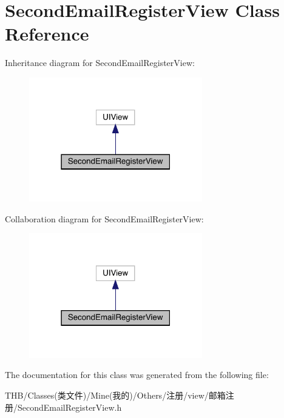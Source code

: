 \hypertarget{interface_second_email_register_view}{}\section{Second\+Email\+Register\+View Class Reference}
\label{interface_second_email_register_view}


Inheritance diagram for Second\+Email\+Register\+View\+:\nopagebreak
\begin{figure}[H]
\begin{center}
\leavevmode
\includegraphics[width=214pt]{interface_second_email_register_view__inherit__graph}
\end{center}
\end{figure}


Collaboration diagram for Second\+Email\+Register\+View\+:\nopagebreak
\begin{figure}[H]
\begin{center}
\leavevmode
\includegraphics[width=214pt]{interface_second_email_register_view__coll__graph}
\end{center}
\end{figure}


The documentation for this class was generated from the following file\+:\begin{DoxyCompactItemize}
\item 
T\+H\+B/\+Classes(类文件)/\+Mine(我的)/\+Others/注册/view/邮箱注册/Second\+Email\+Register\+View.\+h\end{DoxyCompactItemize}
